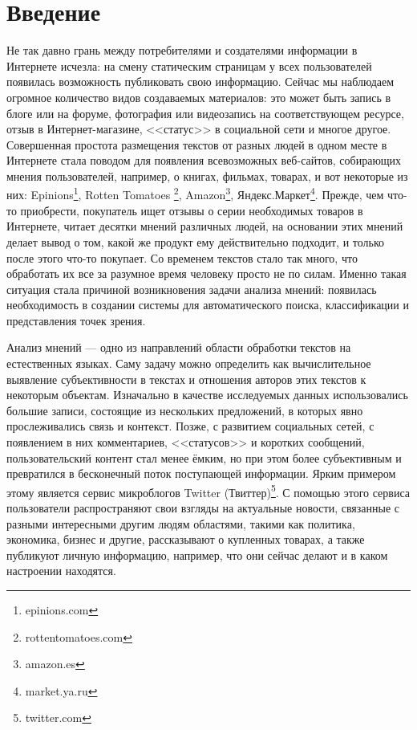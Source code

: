 
\section*{Введение}

Не так давно грань между потребителями и создателями информации в Интернете
исчезла: на смену статическим страницам у всех пользователей появилась
возможность публиковать свою информацию. Сейчас мы наблюдаем огромное
количество видов создаваемых материалов: это может быть запись
в блоге или на форуме, фотография или видеозапись на соответствующем
ресурсе, отзыв в Интернет-магазине, <<статус>> в социальной сети и многое другое.
Совершенная простота размещения текстов от разных людей в одном месте
в Интернете стала поводом для появления всевозможных веб-сайтов, собирающих мнения
пользователей, например, о книгах, фильмах, товарах, и вот некоторые из них:
Epinions\footnote{epinions.com}, Rotten Tomatoes \footnote{rottentomatoes.com},
Amazon\footnote{amazon.es}, Яндекс.Маркет\footnote{market.ya.ru}. Прежде, чем что-то приобрести,
покупатель ищет отзывы о серии необходимых товаров в Интернете, читает
десятки мнений различных людей, на основании этих мнений делает вывод о том,
какой же продукт ему действительно подходит, и только после этого что-то покупает.
Со временем текстов стало так много, что обработать их все за разумное время человеку просто
не по силам. Именно такая ситуация стала причиной возникновения
задачи анализа мнений: появилась необходимость в создании системы для
автоматического поиска, классификации и представления точек зрения.

Анализ мнений --- одно из направлений области обработки текстов на естественных
языках. Саму задачу можно определить как вычислительное выявление
субъективности в текстах и отношения авторов этих текстов к некоторым объектам.
Изначально в качестве исследуемых данных использовались большие записи,
состоящие из нескольких предложений, в которых явно прослеживались связь и
контекст. Позже, с развитием социальных сетей, с появлением в них комментариев,
<<статусов>> и  коротких сообщений, пользовательский контент стал менее ёмким,
но при этом более субъективным и превратился в бесконечный поток поступающей
информации. Ярким примером этому является сервис микроблогов
Twitter (Твиттер)\footnote{twitter.com}. С помощью этого сервиса пользователи распространяют
свои взгляды на актуальные новости, связанные с разными интересными
другим людям областями, такими как политика, экономика, бизнес и другие,
рассказывают о купленных товарах, а также публикуют личную информацию, например,
что они сейчас делают и в каком настроении находятся.


